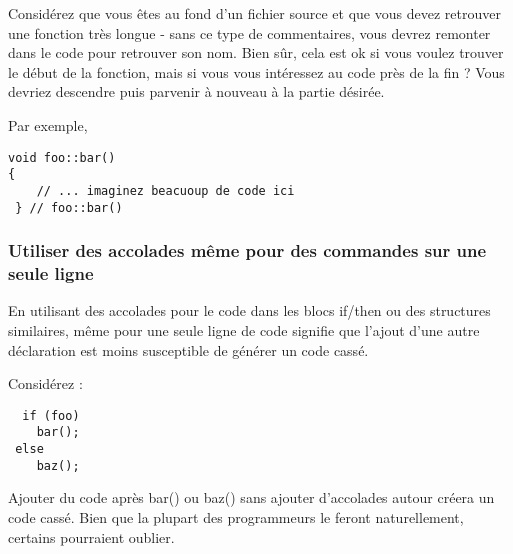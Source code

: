 Consid\'erez que vous \^etes au fond d'un fichier source et que vous devez retrouver une fonction tr\`es longue - sans ce type de commentaires, vous devrez remonter dans le code pour retrouver son nom. Bien s\^ur, cela est ok si vous voulez trouver le d\'ebut de la fonction, mais si vous vous int\'eressez au code pr\`es de la fin ? Vous devriez descendre puis parvenir \`a nouveau \`a la partie d\'esir\'ee.

Par exemple,

\begin{verbatim}
void foo::bar()
{ 
    // ... imaginez beacuoup de code ici
 } // foo::bar()
\end{verbatim}

\subsubsection{Utiliser des accolades m\^eme pour des commandes sur une seule ligne}
En utilisant des accolades pour le code dans les blocs if/then ou des structures similaires, m\^eme pour une seule ligne de code signifie que l'ajout d'une autre d\'eclaration est moins susceptible de g\'en\'erer un code cass\'e.

Consid\'erez :

\begin{verbatim}
  if (foo)
    bar();
 else
    baz();
\end{verbatim}

Ajouter du code apr\`es bar() ou baz() sans ajouter d'accolades autour cr\'eera un code cass\'e. Bien que la plupart des programmeurs le feront naturellement, certains pourraient oublier.

